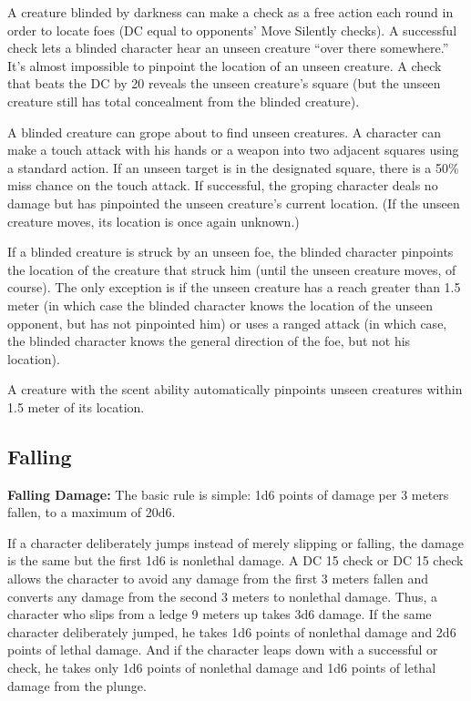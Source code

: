 A creature blinded by darkness can make a  check as a free action each round in order to locate foes (DC equal to opponents' Move Silently checks). A successful check lets a blinded character hear an unseen creature “over there somewhere.” It's almost impossible to pinpoint the location of an unseen creature. A  check that beats the DC by 20 reveals the unseen creature's square (but the unseen creature still has total concealment from the blinded creature).

\begin{itemize*}
\item A blinded creature can grope about to find unseen creatures. A character can make a touch attack with his hands or a weapon into two adjacent squares using a standard action. If an unseen target is in the designated square, there is a 50\% miss chance on the touch attack. If successful, the groping character deals no damage but has pinpointed the unseen creature's current location. (If the unseen creature moves, its location is once again unknown.)
\item If a blinded creature is struck by an unseen foe, the blinded character pinpoints the location of the creature that struck him (until the unseen creature moves, of course). The only exception is if the unseen creature has a reach greater than 1.5 meter (in which case the blinded character knows the location of the unseen opponent, but has not pinpointed him) or uses a ranged attack (in which case, the blinded character knows the general direction of the foe, but not his location).
\item A creature with the scent ability automatically pinpoints unseen creatures within 1.5 meter of its location.
\end{itemize*}


\subsection{Falling}
\textbf{Falling Damage:} The basic rule is simple: 1d6 points of damage per 3 meters fallen, to a maximum of 20d6.

If a character deliberately jumps instead of merely slipping or falling, the damage is the same but the first 1d6 is nonlethal damage. A DC 15  check or DC 15  check allows the character to avoid any damage from the first 3 meters fallen and converts any damage from the second 3 meters to nonlethal damage. Thus, a character who slips from a ledge 9 meters up takes 3d6 damage. If the same character deliberately jumped, he takes 1d6 points of nonlethal damage and 2d6 points of lethal damage. And if the character leaps down with a successful  or  check, he takes only 1d6 points of nonlethal damage and 1d6 points of lethal damage from the plunge.

